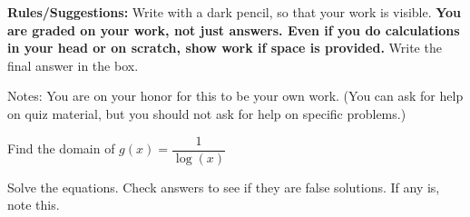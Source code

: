 \documentclass[11pt,addpoints,answers]{exam}
\begin{document}


{\small \noindent \textbf{Rules/Suggestions:} Write with a dark pencil, so that your work is visible.  \textbf{You are graded on your work, not just answers. Even if you do calculations in your head or on scratch, show work if space is provided. } Write the final answer in the box.

Notes: You are on your honor for this to be your own work.  (You can ask for help on quiz material, but you should not ask for help on specific problems.) }
\begin{questions}


\setlength\columnsep{2cm}

\question[12] Find the domain of $g(x) = \dfrac{1}{\log(x)}$


\vspace{.3in}
\begin{flushright}\end{flushright}

\question Solve the equations.  Check answers to see if they are false solutions.  If any is, note this.

\end{questions}
\end{document}
